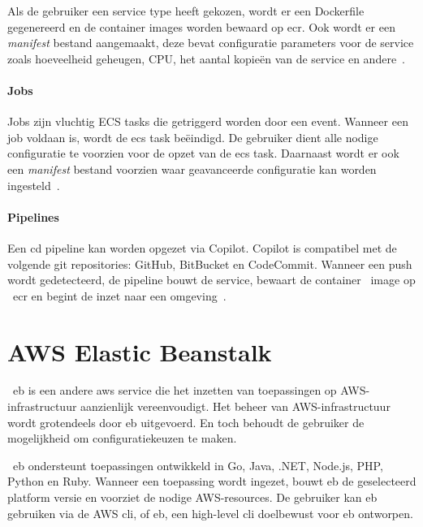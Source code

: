 Als de gebruiker een service type heeft gekozen, wordt er een Dockerfile gegenereerd en de container \glspl{image} worden bewaard op \acrfull{ecr}.
Ook wordt er een \emph{manifest} bestand aangemaakt, deze bevat configuratie parameters voor de service zoals hoeveelheid geheugen, CPU, het aantal kopieën van de service en andere~\autocite{Karakus2022}.

\paragraph{Jobs}

Jobs zijn vluchtig ECS tasks die getriggerd worden door een event.
Wanneer een job voldaan is, wordt de \acrshort{ecs} task beëindigd.
De gebruiker dient alle nodige configuratie te voorzien voor de opzet van de \acrshort{ecs} task.
Daarnaast wordt er ook een \emph{manifest} bestand voorzien waar geavanceerde configuratie kan worden ingesteld~\autocite{Karakus2022}.

\paragraph{Pipelines}

Een \acrfull{cd} pipeline kan worden opgezet via Copilot.
Copilot is compatibel met de volgende git repositories: GitHub, BitBucket en CodeCommit.
Wanneer een push wordt gedetecteerd, de pipeline bouwt de service, bewaart de container ~\gls{image} op ~\acrshort{ecr} en begint de inzet naar een omgeving~\autocite{Karakus2022}.

\section{AWS Elastic Beanstalk}
\label{subsec:service-elastic-beanstalk}

~\acrfull{eb} is een andere \acrshort{aws} service die het inzetten van toepassingen op AWS-infrastructuur aanzienlijk vereenvoudigt.
Het beheer van AWS-infrastructuur wordt grotendeels door \acrshort{eb} uitgevoerd.
En toch behoudt de gebruiker de mogelijkheid om configuratiekeuzen te maken.

~\acrlong{eb} ondersteunt toepassingen ontwikkeld in Go, Java, .NET, Node.js, PHP, Python en Ruby.
Wanneer een toepassing wordt ingezet, bouwt \acrshort{eb} de geselecteerd platform versie en voorziet de nodige AWS-resources.
De gebruiker kan \acrlong{eb} gebruiken via de AWS \acrfull{cli}, of eb, een high-level \acrshort{cli} doelbewust voor \acrlong{eb} ontworpen.

